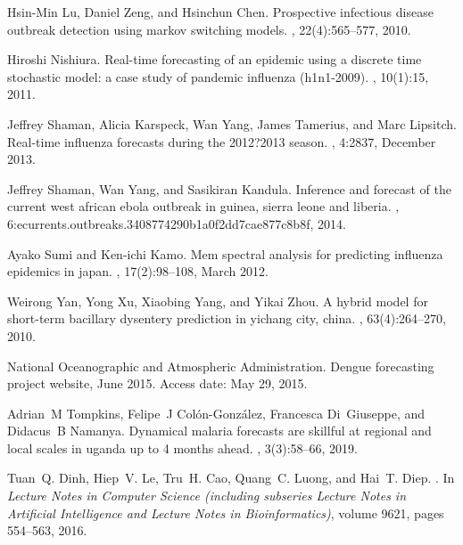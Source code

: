 \documentclass[a4paper]{article}
\begin{document}
\begin{thebibliography}{100}
Hsin-Min Lu, Daniel Zeng, and Hsinchun Chen.
\newblock Prospective infectious disease outbreak detection using markov
  switching models.
,
  22(4):565--577, 2010.

Hiroshi Nishiura.
\newblock Real-time forecasting of an epidemic using a discrete time stochastic
  model: a case study of pandemic influenza (h1n1-2009).
, 10(1):15, 2011.

Jeffrey Shaman, Alicia Karspeck, Wan Yang, James Tamerius, and Marc Lipsitch.
\newblock Real-time influenza forecasts during the 2012?2013 season.
, 4:2837, December 2013.

Jeffrey Shaman, Wan Yang, and Sasikiran Kandula.
\newblock Inference and forecast of the current west african ebola outbreak in
  guinea, sierra leone and liberia.
,
  6:ecurrents.outbreaks.3408774290b1a0f2dd7cae877c8b8f, 2014.

Ayako Sumi and Ken-ichi Kamo.
\newblock Mem spectral analysis for predicting influenza epidemics in japan.
, 17(2):98--108,
  March 2012.

Weirong Yan, Yong Xu, Xiaobing Yang, and Yikai Zhou.
\newblock A hybrid model for short-term bacillary dysentery prediction in
  yichang city, china.
, 63(4):264--270, 2010.

{National Oceanographic and Atmospheric Administration}.
\newblock Dengue forecasting project website, June 2015.
\newblock Access date: May 29, 2015.

Adrian~M Tompkins, Felipe~J Col{\'o}n-Gonz{\'a}lez, Francesca Di~Giuseppe, and
  Didacus~B Namanya.
\newblock Dynamical malaria forecasts are skillful at regional and local scales
  in uganda up to 4 months ahead.
, 3(3):58--66, 2019.

Tuan~Q. Dinh, Hiep~V. Le, Tru~H. Cao, Quang~C. Luong, and Hai~T. Diep.
.
\newblock In {\em Lecture Notes in Computer Science (including subseries
  Lecture Notes in Artificial Intelligence and Lecture Notes in
  Bioinformatics)}, volume 9621, pages 554--563, 2016.


\end{thebibliography}
\end{document}
